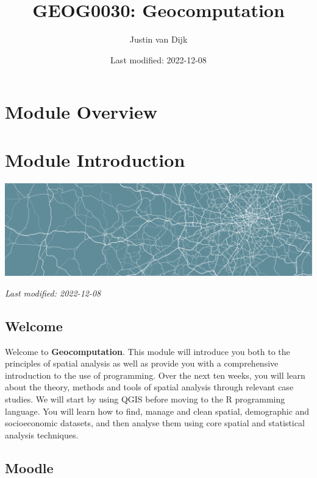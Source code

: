 \documentclass[
]{book}
\title{GEOG0030: Geocomputation}
\author{Justin van Dijk}
\date{Last modified: 2022-12-08}
\begin{document}
\maketitle

{
\setcounter{tocdepth}{1}
\tableofcontents
}
\hypertarget{module-overview}{%
\chapter*{Module Overview}\label{module-overview}}

\hypertarget{module-introduction}{%
\chapter*{Module Introduction}\label{module-introduction}}

\begin{center}\includegraphics[width=1\linewidth]{images/general/geocomputation_welcome} \end{center}

\emph{Last modified: 2022-12-08}

\hypertarget{welcome}{%
\section*{Welcome}\label{welcome}}

Welcome to \textbf{Geocomputation}. This module will introduce you both to the principles of spatial analysis as well as provide you with a comprehensive introduction to the use of programming. Over the next ten weeks, you will learn about the theory, methods and tools of spatial analysis through relevant case studies. We will start by using QGIS before moving to the R programming language. You will learn how to find, manage and clean spatial, demographic and socioeconomic datasets, and then analyse them using core spatial and statistical analysis techniques.

\hypertarget{moodle}{%
\section*{Moodle}\label{moodle}}
\end{document}
